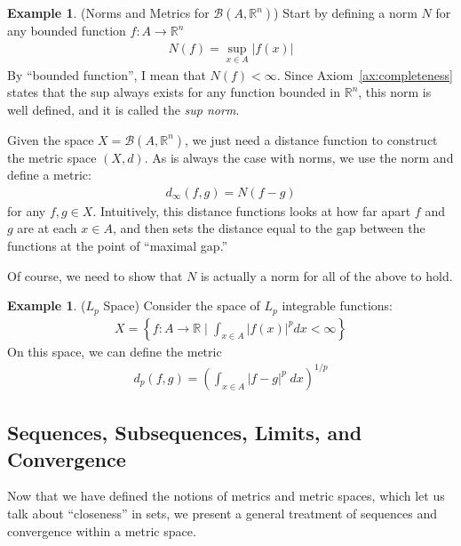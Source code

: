\documentclass[12pt]{article}
\theoremstyle{plain}
\theoremstyle{definition}
\newtheorem{ex}[thm]{Example}
\theoremstyle{remark}
\newcommand{\R}{\mathbb{R}}
\begin{document}
\begin{ex}{(Norms and Metrics for $\mathscr{B}(A,\R^n)$)}
Start by defining a norm $N$ for any bounded function $f:A
\rightarrow \R^n$
\begin{align*}
  N(f) = \sup_{x\in A} |f(x)|
\end{align*}
By ``bounded function'', I mean that $N(f)<\infty$.  Since
Axiom~\ref{ax:completeness} states that the sup always exists for any
function bounded in $\R^n$, this norm is well
defined, and it is called the \emph{sup norm}.

Given the space $X=\mathscr{B}(A,\R^n)$, we just need a distance
function to construct the metric space $(X,d)$. As is always the case
with norms, we use the norm and define a metric:
\begin{align*}
  d_\infty(f,g) = N(f-g)
\end{align*}
for any $f,g\in X$. Intuitively, this distance functions looks at how
far apart $f$ and $g$ are at each $x\in A$, and then sets the distance
equal to the gap between the functions at the point of ``maximal gap.''

Of course, we need to show that $N$ is actually a norm for all of the
above to hold.
\end{ex}

\begin{ex}{($L_p$ Space)}
Consider the space of $L_p$ integrable functions:
\begin{align*}
  X = \left\{
    f:A\rightarrow \R \; \big|\;
    \int_{x\in A} |f(x)|^p dx <\infty
  \right\}
\end{align*}
On this space, we can define the metric
\begin{align*}
  d_p(f,g) = \left(\int_{x\in A} |f-g|^p \; dx\right)^{1/p}
\end{align*}
\end{ex}

\subsection{Sequences, Subsequences, Limits, and Convergence}

Now that we have defined the notions of metrics and metric spaces, which
let us talk about ``closeness'' in sets, we present a general treatment
of sequences and convergence within a metric space.
\end{document}
